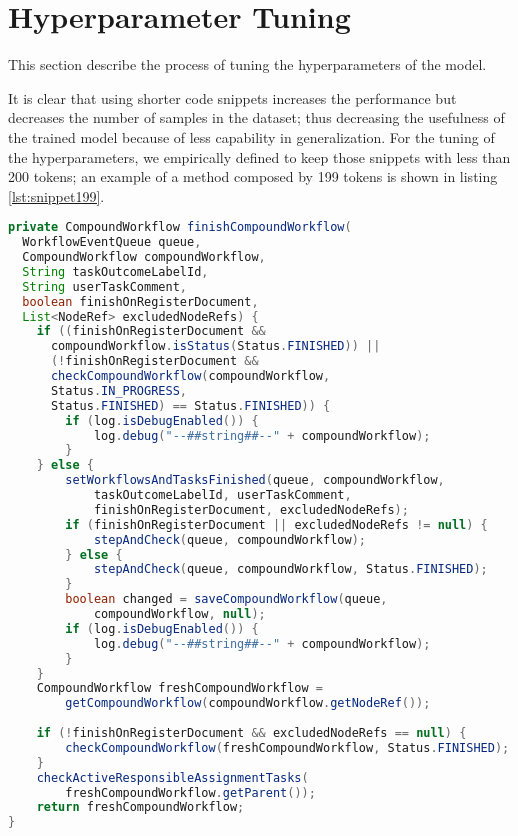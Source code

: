 


\section{Hyperparameter Tuning}

This section describe the process of tuning the hyperparameters of the model.

It is clear that using shorter code snippets increases the performance but decreases the number of samples in the dataset; thus decreasing the usefulness of the trained model because of less capability in generalization.
For the tuning of the hyperparameters, we empirically defined to keep those snippets with less than 200 tokens; an example of a method composed by 199 tokens is shown in listing \ref{lst:snippet199}.

\begin{lstlisting}[caption={Code snippet with 199 tokens}, label={lst:snippet199},language=Java]
private CompoundWorkflow finishCompoundWorkflow(
  WorkflowEventQueue queue,
  CompoundWorkflow compoundWorkflow, 
  String taskOutcomeLabelId, 
  String userTaskComment, 
  boolean finishOnRegisterDocument, 
  List<NodeRef> excludedNodeRefs) {
    if ((finishOnRegisterDocument &&
      compoundWorkflow.isStatus(Status.FINISHED)) ||
      (!finishOnRegisterDocument &&
      checkCompoundWorkflow(compoundWorkflow,
      Status.IN_PROGRESS, 
      Status.FINISHED) == Status.FINISHED)) {
        if (log.isDebugEnabled()) {
            log.debug("--##string##--" + compoundWorkflow);
        }
    } else {
        setWorkflowsAndTasksFinished(queue, compoundWorkflow, 
            taskOutcomeLabelId, userTaskComment,
            finishOnRegisterDocument, excludedNodeRefs);
        if (finishOnRegisterDocument || excludedNodeRefs != null) {
            stepAndCheck(queue, compoundWorkflow);
        } else {
            stepAndCheck(queue, compoundWorkflow, Status.FINISHED);
        }
        boolean changed = saveCompoundWorkflow(queue,
            compoundWorkflow, null);
        if (log.isDebugEnabled()) {
            log.debug("--##string##--" + compoundWorkflow);
        }
    }
    CompoundWorkflow freshCompoundWorkflow =
        getCompoundWorkflow(compoundWorkflow.getNodeRef());
        
    if (!finishOnRegisterDocument && excludedNodeRefs == null) {
        checkCompoundWorkflow(freshCompoundWorkflow, Status.FINISHED);
    }
    checkActiveResponsibleAssignmentTasks(
        freshCompoundWorkflow.getParent());
    return freshCompoundWorkflow;
}
\end{lstlisting}

